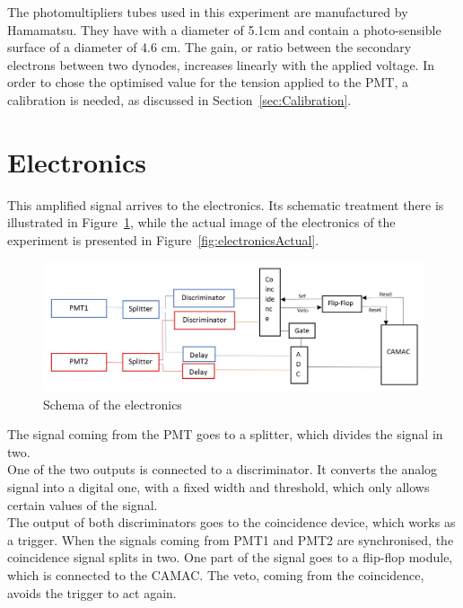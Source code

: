 \documentclass[10pt,swedish, openany]{book}
\begin{document}
The photomultipliers tubes used in this experiment are manufactured by Hamamatsu. They have with a diameter of 5.1cm and contain a photo-sensible surface of a diameter of 4.6 cm. The gain, or ratio between the secondary electrons between two dynodes, increases linearly with the applied voltage.
In order to chose the optimised value for the tension applied to the PMT, a calibration is needed, as discussed in Section~\ref{sec:Calibration}.

\section{Electronics}

This amplified signal arrives to the electronics. Its schematic treatment there is illustrated in Figure~\ref{fig:electronicsSchema}, while the actual image of the electronics of the experiment is presented in Figure~\ref{fig:electronicsActual}.

\begin{figure}[H]
\includegraphics[scale=0.5]{electronics.JPG}
\centering
\caption{Schema of the electronics}
\label{fig:electronicsSchema}
\end{figure}

The signal coming from the PMT goes to a splitter, which divides the signal in two. \\

One of the two outputs is connected to a discriminator. It converts the analog signal into a digital one, with a fixed width and threshold, which only allows certain values of the signal.\\

The output of both discriminators goes to the coincidence device, which works as a trigger. When the signals coming from PMT1 and PMT2 are synchronised, the coincidence signal splits in two. One part of the signal goes to a flip-flop module, which is connected to the CAMAC. The veto, coming from the coincidence, avoids the trigger to act again.\\
\end{document}

